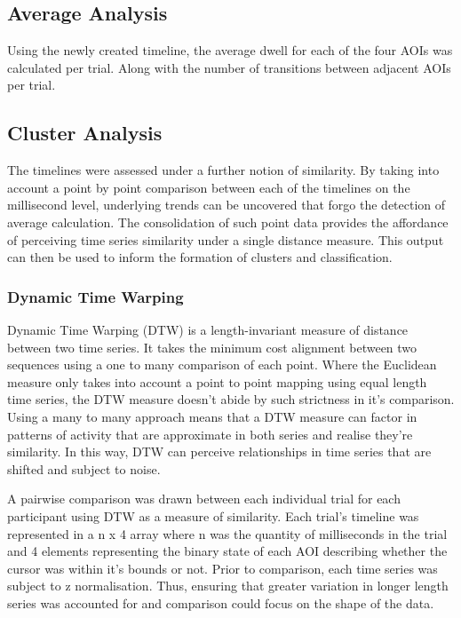 \documentclass[man, floatsintext]{apa7}
\begin{document}
\subsection{Average Analysis}

Using the newly created timeline, the average dwell for each of the four AOIs was calculated per trial. Along with the number of transitions between adjacent AOIs per trial. 

\subsection{Cluster Analysis}

The timelines were assessed under a further notion of similarity. By taking into account a point by point comparison between each of the timelines on the millisecond level, underlying trends can be uncovered that forgo the detection of average calculation. The consolidation of such point data provides the affordance of perceiving time series similarity under a single distance measure. This output can then be used to inform the formation of clusters and classification.

\subsubsection{Dynamic Time Warping}

Dynamic Time Warping (DTW) is a length-invariant measure of distance between two time series. It takes the minimum cost alignment between two sequences using a one to many comparison of each point. Where the Euclidean measure only takes into account a point to point mapping using equal length time series, the DTW measure doesn't abide by such strictness in it's comparison. Using a many to many approach means that a DTW measure can factor in patterns of activity that are approximate in both series and realise they're similarity. In this way, DTW can perceive relationships in time series that are shifted and subject to noise.

A pairwise comparison was drawn between each individual trial for each participant using  DTW as a measure of similarity. Each trial's timeline was represented in a n x 4 array where n was the quantity of milliseconds in the trial and 4 elements representing the binary state of each AOI describing whether the cursor was within it's bounds or not. Prior to comparison, each time series was subject to z normalisation. Thus, ensuring that greater variation in longer length series was accounted for and comparison could focus on the shape of the data.
\end{document}
